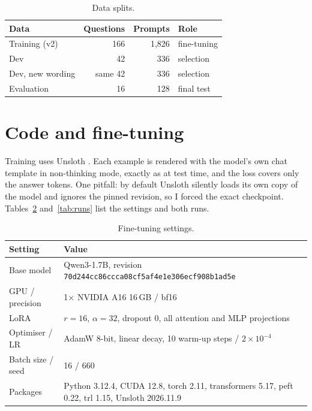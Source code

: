 \documentclass[11pt]{article}
\begin{document}
\begin{table}[t]
\centering\small
\begin{tabular}{lrrl}
\toprule
Data & Questions & Prompts & Role\\
\midrule
Training (v2)  & 166 & 1{,}826 & fine-tuning\\
Dev            & 42  & 336 & selection\\
Dev, new wording & same 42 & 336 & selection\\
Evaluation     & 16  & 128 & final test\\
\bottomrule
\end{tabular}
\caption{Data splits.}
\label{tab:splits}
\end{table}

\section{Code and fine-tuning}
Training uses Unsloth \citep{unsloth}. Each example is rendered with the model's own chat template in non-thinking mode, exactly as at test time, and the loss covers only the answer tokens.
One pitfall: by default Unsloth silently loads its own copy of the model and ignores the pinned revision, so I forced the exact checkpoint. Tables~\ref{tab:settings} and~\ref{tab:runs} list the settings and both runs.

\begin{table}[t]
\centering\small
\begin{tabularx}{\columnwidth}{@{}lX@{}}
\toprule
Setting & Value\\
\midrule
Base model & Qwen3-1.7B, revision \texttt{70d244cc86ccca08cf5a\allowbreak f4e1e306ecf908b1ad5e}\\
GPU / precision & 1$\times$ NVIDIA A16 16\,GB / bf16\\
LoRA & $r{=}16$, $\alpha{=}32$, dropout 0, all attention and MLP projections\\
Optimiser / LR & AdamW 8-bit, linear decay, 10 warm-up steps / $2{\times}10^{-4}$\\
Batch size / seed & 16 / 660\\
Packages & Python 3.12.4, CUDA 12.8, torch 2.11, transformers 5.17, peft 0.22, trl 1.15, Unsloth 2026.11.9\\
\bottomrule
\end{tabularx}
\caption{Fine-tuning settings.}
\label{tab:settings}
\end{table}
\end{document}
